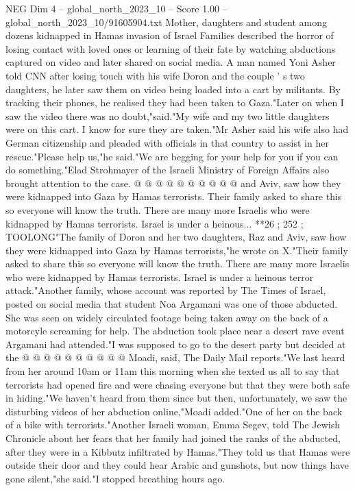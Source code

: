 \begin{textsample}{NEG Dim 4 – global\_north\_2023\_10 – Score 1.00 – global\_north\_2023\_10/91605904.txt}  \label{ex:f4_neg_004}
Mother, daughters and student among dozens kidnapped in Hamas invasion of Israel Families described the horror of losing contact with loved ones or learning of their fate by watching abductions captured on video and later shared on social media.
A man named Yoni Asher told CNN after losing touch with his wife Doron and the couple ' s two daughters, he later saw them on video being loaded into a cart by militants.
By tracking their phones, he realised they had been taken to Gaza."Later on when I saw the video there was no doubt,"said."My wife and my two little daughters were on this cart.
I know for sure they are taken."Mr Asher said his wife also had German citizenship and pleaded with officials in that country to assist in her rescue."Please help us,"he said."We are begging for your help for you if you can do something."Elad Strohmayer of the Israeli Ministry of Foreign Affairs also brought attention to the case. @ @ @ @ @ @ @ @ @ @ and Aviv, saw how they were kidnapped into Gaza by Hamas terrorists.
Their family asked to share this so everyone will know the truth.
There are many more Israelis who were kidnapped by Hamas terrorists.
Israel is under a heinous... **26 ; 252 ; TOOLONG"The family of Doron and her two daughters, Raz and Aviv, saw how they were kidnapped into Gaza by Hamas terrorists,"he wrote on X."Their family asked to share this so everyone will know the truth.
There are many more Israelis who were kidnapped by Hamas terrorists.
Israel is under a heinous terror attack."Another family, whose account was reported by The Times of Israel, posted on social media that student Noa Argamani was one of those abducted.
She was seen on widely circulated footage being taken away on the back of a motorcyle screaming for help.
The abduction took place near a desert rave event Argamani had attended."I was supposed to go to the desert party but decided at the @ @ @ @ @ @ @ @ @ @ Moadi, said, The Daily Mail reports."We last heard from her around 10am or 11am this morning when she texted us all to say that terrorists had opened fire and were chasing everyone but that they were both safe in hiding."We haven't heard from them since but then, unfortunately, we saw the disturbing videos of her abduction online,"Moadi added."One of her on the back of a bike with terrorists."Another Israeli woman, Emma Segev, told The Jewish Chronicle about her fears that her family had joined the ranks of the abducted, after they were in a Kibbutz infiltrated by Hamas."They told us that Hamas were outside their door and they could hear Arabic and gunshots, but now things have gone silent,"she said."I stopped breathing hours ago.

\end{textsample}

